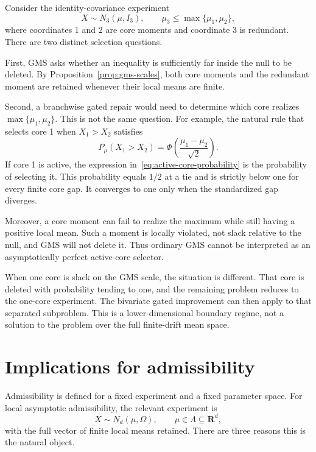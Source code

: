 \documentclass[12pt]{article}
\theoremstyle{remark}
\begin{document}
Consider the identity-covariance experiment
\[
X\sim N_3(\mu,I_3),
\qquad
\mu_3\le\max\{\mu_1,\mu_2\},
\]
where coordinates 1 and 2 are core moments and coordinate 3 is redundant.
There are two distinct selection questions.

First, GMS asks whether an inequality is sufficiently far inside the null to
be deleted.  By Proposition~\ref{prop:gms-scales}, both core moments and the
redundant moment are retained whenever their local means are finite.

Second, a branchwise gated repair would need to determine which core realizes
$\max\{\mu_1,\mu_2\}$.  This is not the same question.  For example, the
natural rule that selects core 1 when $X_1>X_2$ satisfies
\begin{equation}\label{eq:active-core-probability}
P_\mu(X_1>X_2)
=
\Phi\left(\frac{\mu_1-\mu_2}{\sqrt2}\right).
\end{equation}
If core 1 is active, the expression in~\eqref{eq:active-core-probability} is
the probability of selecting it.  This probability equals $1/2$ at a tie and
is strictly below one for every finite core gap.  It converges to one only
when the standardized gap diverges.

Moreover, a core moment can fail to realize the maximum while still having a
positive local mean.  Such a moment is locally violated, not slack relative
to the null, and GMS will not delete it.  Thus ordinary GMS cannot be
interpreted as an asymptotically perfect active-core selector.

When one core is slack on the GMS scale, the situation is different.  That
core is deleted with probability tending to one, and the remaining problem
reduces to the one-core experiment.  The bivariate gated improvement can then
apply to that separated subproblem.  This is a lower-dimensional boundary
regime, not a solution to the problem over the full finite-drift mean space.

\section{Implications for admissibility}

Admissibility is defined for a fixed experiment and a fixed parameter space.
For local asymptotic admissibility, the relevant experiment is
\[
X\sim N_d(\mu,\Omega),
\qquad
\mu\in\Lambda\subseteq\mathbf R^d,
\]
with the full vector of finite local means retained.  There are three reasons
this is the natural object.
\end{document}
